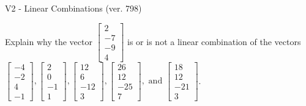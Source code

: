 \begin{exercise}
  \begin{exerciseTitle}V2 - Linear Combinations (ver. 798)\end{exerciseTitle}
  \begin{exerciseStatement}
    Explain why the vector \(\left[\begin{array}{c}
2 \\
-7 \\
-9 \\
4
\end{array}\right]\)  is or is not a linear 
	combination of the vectors \(\left[\begin{array}{c}
-4 \\
-2 \\
4 \\
-1
\end{array}\right] , \left[\begin{array}{c}
2 \\
0 \\
-1 \\
1
\end{array}\right] , \left[\begin{array}{c}
12 \\
6 \\
-12 \\
3
\end{array}\right] , \left[\begin{array}{c}
26 \\
12 \\
-25 \\
7
\end{array}\right] , \text{ and } \left[\begin{array}{c}
18 \\
12 \\
-21 \\
3
\end{array}\right]\).
	



\end{exerciseStatement}
\end{exercise}
